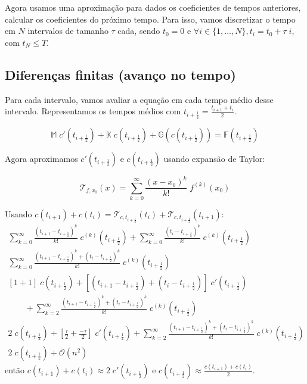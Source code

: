 \documentclass[a4paper]{article}
\begin{document}
Agora usamos uma aproximação para
dados os coeficientes de tempos anteriores,
calcular os coeficientes do próximo tempo.
Para isso,
vamos discretizar o tempo
em \(N\) intervalos de tamanho \(\tau\) cada,
sendo \(t_0 = 0\) e
\(\forall i \in \{ 1, \dots, N \}, t_i = t_0 + \tau \; i\),
com \(t_N \le T\).

\subsection{Diferenças finitas (avanço no tempo)}

Para cada intervalo,
vamos avaliar a equação em cada
tempo médio desse intervalo.
Representamos os tempos médios com
\(t_{i + \frac12} = \frac{t_{i+1} + t_i}{2}\).

\[
    \mathbb{M} \; c'(t_{i+\frac12})
    + \mathbb{K} \; c(t_{i+\frac12})
    + \mathbb{G}(c(t_{i+\frac12}))
    = \mathbb{F}(t_{i+\frac12})
\]

Agora aproximamos \(c'(t_{i+\frac12})\) e \(c(t_{i+\frac12})\)
usando expansão de Taylor:

\[
    \mathcal{T}_{f,x_0}(x)
    = \sum_{k=0}^{\infty} \frac{(x - x_0)^k}{k!} \; f^{(k)}(x_0)
\]

Usando
\(
    c(t_{i+1}) + c(t_i)
    =
    \mathcal{T}_{c,t_{i+\frac12}}(t_i)
    + \mathcal{T}_{c,t_{i+\frac12}}(t_{i+1})
\):
\[ \begin{array}{l} \displaystyle
    \sum_{k=0}^{\infty} \frac{(t_{i+1} - t_{i+\frac12})^k}{k!} \; c^{(k)}(t_{i+\frac12})
    + \sum_{k=0}^{\infty} \frac{(t_i - t_{i+\frac12})^k}{k!} \; c^{(k)}(t_{i+\frac12})
    \\ \displaystyle
    \sum_{k=0}^{\infty} \frac{(t_{i+1} - t_{i+\frac12})^k + (t_i - t_{i+\frac12})^k}{k!} \; c^{(k)}(t_{i+\frac12})
    \\ \displaystyle
    \left[1 + 1\right] \; c(t_{i+\frac12})
    + \left[ (t_{i+1} - t_{i+\frac12}) + (t_i - t_{i+\frac12}) \right] \; c'(t_{i+\frac12})
    \\\qquad \displaystyle
    + \sum_{k=2}^{\infty} \frac{(t_{i+1} - t_{i+\frac12})^k + (t_i - t_{i+\frac12})^k}{k!} \; c^{(k)}(t_{i+\frac12})
    \\ \displaystyle
    2 \; c(t_{i+\frac12})
    + \left[ \frac{\tau}{2} + \frac{-\tau}{2} \right] \; c'(t_{i+\frac12})
    + \sum_{k=2}^{\infty} \frac{(t_{i+1} - t_{i+\frac12})^k + (t_i - t_{i+\frac12})^k}{k!} \; c^{(k)}(t_{i+\frac12})
    \\ \displaystyle
    2 \; c(t_{i+\frac12})
    + \mathcal{O}(n^2)
\end{array} \]
então \(
    c(t_{i+1}) + c(t_i)
    \approx
    2 \; c'(t_{i+\frac12})
\) e \(
    c(t_{i+\frac12})
    \approx
    \frac{c(t_{i+1}) + c(t_i)}{2}
\).
\end{document}
